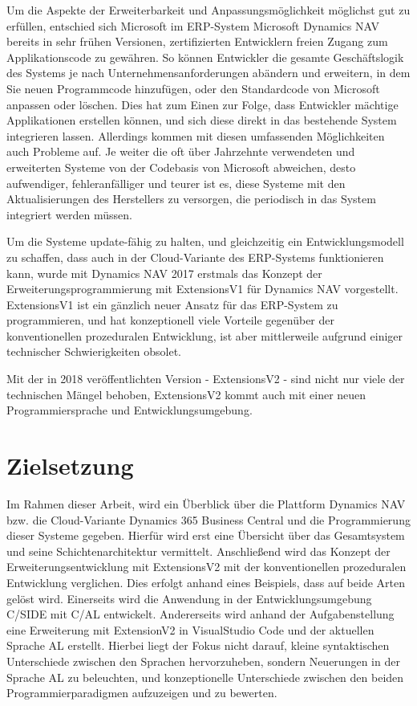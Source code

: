 Um die Aspekte der Erweiterbarkeit und Anpassungsmöglichkeit möglichst gut zu erfüllen, entschied sich Microsoft im ERP-System Microsoft Dynamics NAV bereits in sehr frühen Versionen, zertifizierten Entwicklern freien Zugang zum Applikationscode zu gewähren\cite{BrummelPatterns2015}. So können Entwickler die gesamte Geschäftslogik des Systems je nach Unternehmensanforderungen abändern und erweitern, in dem Sie neuen Programmcode hinzufügen, oder den Standardcode von Microsoft anpassen oder löschen. Dies hat zum Einen zur Folge, dass Entwickler mächtige Applikationen erstellen können, und sich diese direkt in das bestehende System integrieren lassen. Allerdings kommen mit diesen umfassenden Möglichkeiten auch Probleme auf. Je weiter die oft über Jahrzehnte verwendeten und erweiterten Systeme von der Codebasis von Microsoft abweichen, desto aufwendiger, fehleranfälliger und teurer ist es, diese Systeme mit den Aktualisierungen des Herstellers zu versorgen, die periodisch in das System integriert werden müssen.  

Um die Systeme update-fähig zu halten, und gleichzeitig ein Entwicklungsmodell zu schaffen, dass auch in der Cloud-Variante des ERP-Systems funktionieren kann, wurde mit Dynamics NAV 2017 erstmals das Konzept der Erweiterungsprogrammierung mit ExtensionsV1 für Dynamics NAV vorgestellt. ExtensionsV1 ist ein gänzlich neuer Ansatz für das ERP-System zu programmieren, und hat konzeptionell viele Vorteile gegenüber der konventionellen prozeduralen Entwicklung, ist aber mittlerweile aufgrund einiger technischer Schwierigkeiten obsolet.

Mit der in 2018 veröffentlichten Version - ExtensionsV2 - sind nicht nur viele der technischen Mängel behoben, ExtensionsV2 kommt auch mit einer neuen Programmiersprache und Entwicklungsumgebung.

\section{Zielsetzung}
\label{sec:Zielsetzung}
Im Rahmen dieser Arbeit, wird ein Überblick über die Plattform Dynamics NAV bzw. die Cloud-Variante Dynamics 365 Business Central und die Programmierung dieser Systeme gegeben. Hierfür wird erst eine Übersicht über das Gesamtsystem und seine Schichtenarchitektur vermittelt. Anschließend wird das Konzept der Erweiterungsentwicklung mit ExtensionsV2 mit der konventionellen prozeduralen Entwicklung verglichen. Dies erfolgt anhand eines Beispiels, dass auf beide Arten gelöst wird. Einerseits wird die Anwendung in der Entwicklungsumgebung C/SIDE mit C/AL entwickelt. Andererseits wird anhand der Aufgabenstellung eine Erweiterung mit ExtensionV2 in VisualStudio Code und der aktuellen Sprache AL erstellt. Hierbei liegt der Fokus nicht darauf, kleine syntaktischen Unterschiede zwischen den Sprachen hervorzuheben, sondern Neuerungen in der Sprache AL zu beleuchten, und konzeptionelle Unterschiede zwischen den beiden Programmierparadigmen aufzuzeigen und zu bewerten.

